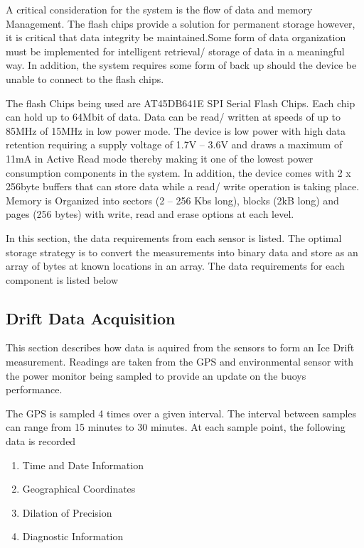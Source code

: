 A critical consideration for the system is the flow of data and memory Management. The flash chips provide a solution for permanent storage however, it is critical that data integrity be maintained.Some form of data organization must be implemented for intelligent retrieval/ storage of data in a meaningful way. In addition, the system requires some form of back up should the device be unable to connect to the flash chips. \par 

The flash Chips being used are AT45DB641E SPI Serial Flash Chips. Each chip can hold up to 64Mbit of data. Data can be read/ written at speeds of up to 85MHz of 15MHz in low power mode. The device is low power with high data retention requiring a supply voltage of 1.7V – 3.6V and draws a maximum of 11mA in Active Read mode thereby making it one of the lowest power consumption components in the system. In addition, the device comes with 2 x 256byte buffers that can store data while a read/ write operation is taking place. Memory is Organized into sectors (2 – 256 Kbs long), blocks (2kB long) and pages (256 bytes) with write, read and erase options at each level. \par 

In this section, the data requirements from each sensor is listed. The optimal storage strategy is to convert the measurements into binary data and store as an array of bytes at known locations in an array. The data requirements for each component is listed below

\subsection{Drift Data Acquisition}
This section describes how data is aquired from the sensors to form an Ice Drift measurement. Readings are taken from the GPS and environmental sensor with the power monitor being sampled to provide an update on the buoys performance.\par 

The GPS is sampled 4 times over a given interval. The interval between samples can range from 15 minutes to 30 minutes. At each sample point, the following data is recorded

\begin{enumerate}
	\item Time and Date Information
	\item Geographical Coordinates
	\item Dilation of Precision
	\item Diagnostic Information
\end{enumerate}

